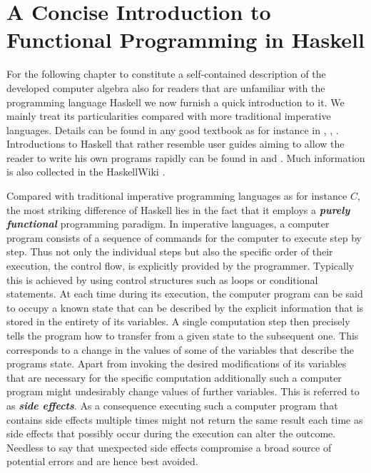 \documentclass[a4paper,12pt, DIV=14, BCOR=5mm, twoside, headsepline, numbers=noenddot]{scrbook}
\begin{document}
\section{A Concise Introduction to Functional Programming in Haskell}
For the following chapter to constitute a self-contained description of the developed computer algebra also for readers that are unfamiliar with the programming language Haskell \cite{Marlow_haskell2010} we now furnish a quick introduction to it. We mainly treat its particularities compared with more traditional imperative languages.
Details can be found in any good textbook as for instance in \cite{Thompson99thecraft}, \cite{bird_2014}, \cite{hutton_2007}. Introductions to Haskell that rather resemble user guides aiming to allow the reader to write his own programs rapidly can be found in  \cite{OSullivan2008} and  \cite{Lipovaca:2011:LYH:2018642}. Much information is also collected in the HaskellWiki \cite{wiki:xxx}.

Compared with traditional imperative programming languages as for instance $C$, the most striking difference of Haskell lies in the fact that it employs a \textbf{\textit{purely functional}} programming paradigm. In imperative languages, a computer program consists of a sequence of commands for the computer to execute step by step. Thus not only the individual steps but also the specific order of their execution, the control flow, is explicitly provided by the programmer. Typically this is achieved by using control structures such as loops or conditional statements. At each time during its execution, the computer program can be said to occupy a known state that can be described by the explicit information that is stored in the entirety of its variables. A single computation step then precisely tells the program how to transfer from a given state to the subsequent one. This corresponds to a change in the values of some of the variables that describe the programs state. Apart from invoking the desired modifications of its variables that are necessary for the specific computation additionally such a computer program might undesirably change values of further variables. This is referred to as \textit{\textbf{side effects}}. As a consequence executing such a computer program that contains side effects multiple times might not return the same result each time as side effects that possibly occur during the execution can alter the outcome. Needless to say that unexpected side effects compromise a broad source of potential errors and are hence best avoided.
\end{document}
